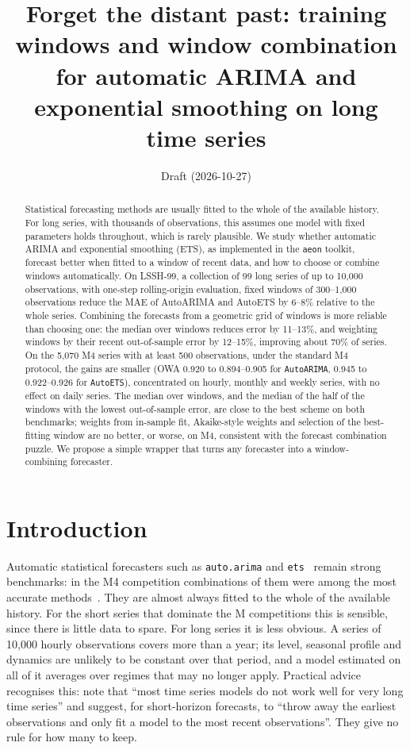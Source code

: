 \documentclass[11pt]{article}
\title{Forget the distant past: training windows and window combination\\
for automatic ARIMA and exponential smoothing on long time series}
\author{Draft (2026-10-27) \todo{authors}}
\date{}
\begin{document}
\maketitle

\begin{abstract}
Statistical forecasting methods are usually fitted to the whole of the
available history. For long series, with thousands of observations, this
assumes one model with fixed parameters holds throughout, which is rarely
plausible. We study whether automatic ARIMA and exponential smoothing (ETS),
as implemented in the \texttt{aeon} toolkit, forecast better when fitted to a
window of recent data, and how to choose or combine windows automatically. On
LSSH-99, a collection of 99 long series of up to 10{,}000 observations, with
one-step rolling-origin evaluation, fixed windows of 300--1{,}000 observations
reduce the MAE of AutoARIMA and AutoETS by 6--8\% relative to the whole series.
Combining the forecasts from a geometric grid of windows is more reliable than
choosing one: the median over windows reduces error by 11--13\%, and weighting
windows by their recent out-of-sample error by 12--15\%, improving about 70\%
of series. On the 5{,}070 M4 series with at least 500
observations, under the standard M4 protocol, the gains are smaller (OWA
0.920 to 0.894--0.905 for \texttt{AutoARIMA}, 0.945 to 0.922--0.926 for
\texttt{AutoETS}), concentrated on hourly, monthly and weekly series, with no
effect on daily series. The median over windows, and the median of the half of
the windows with the lowest out-of-sample error, are close to the best scheme
on both benchmarks; weights from in-sample fit, Akaike-style weights and
selection of the best-fitting window are no better, or worse, on M4,
consistent with the forecast combination puzzle. We propose a simple wrapper
that turns any forecaster into a window-combining forecaster.
\end{abstract}

\section{Introduction}

Automatic statistical forecasters such as \texttt{auto.arima} and
\texttt{ets}~\citep{hyndman08auto,hyndman02state,hyndman08book} remain strong
benchmarks: in the M4 competition combinations of them were among the most
accurate methods~\citep{makridakis20m4}. They are almost always fitted to the
whole of the available history. For the short series that dominate the M
competitions this is sensible, since there is little data to spare. For long
series it is less obvious. A series of 10{,}000 hourly observations covers more
than a year; its level, seasonal profile and dynamics are unlikely to be
constant over that period, and a model estimated on all of it averages over
regimes that may no longer apply. Practical advice recognises this:
\citet{hyndman21fpp3} note that ``most time series models do not work well for
very long time series'' and suggest, for short-horizon forecasts, to ``throw
away the earliest observations and only fit a model to the most recent
observations''. They give no rule for how many to keep.
\end{document}
